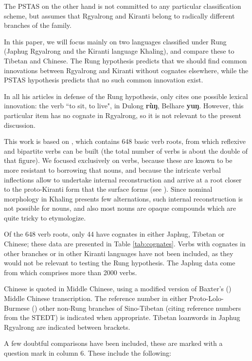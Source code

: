 \documentclass[oldfontcommands,oneside,a4paper,11pt]{article}
\newcommand{\ipa}[1]{{\phon\textbf{#1}}}
\begin{document}
The PSTAS on the other hand is not committed to any particular classification scheme, but assumes that Rgyalrong and Kiranti belong to radically different branches of the family.

In this paper, we will focus mainly on two languages classified under Rung (Japhug Rgyalrong and the Kiranti language Khaling), and compare these to Tibetan and Chinese. The Rung hypothesis predicts that we should find common innovations between Rgyalrong and Kiranti without cognates elsewhere, while the PSTAS hypothesis predicts that no such common innovation exist.

In all his articles in defense of the Rung hypothesis, \citet{lapolla13subgrouping} only cites one possible lexical innovation: the verb ``to sit, to live", in Dulong \ipa{rùŋ}, Belhare \ipa{yuŋ}. However, this particular item has no cognate in Rgyalrong, so it is not relevant to the present discussion.

This work is based on \citet{jacques15khaling}, which contains 648 basic verb roots, from which reflexive and bipartite verbs can be built (the total number of verbs is about the double of that figure). We focused exclusively on verbs, because these are known to be more resistant to borrowing that nouns, and because the intricate verbal inflections allow to undertake internal reconstruction and arrive at a root closer to the proto-Kiranti form that the surface forms (see \citealt{jacques12khaling}). Since nominal morphology in Khaling presents few alternations, such internal reconstruction is not possible for nouns, and also most nouns are opaque compounds which are quite tricky to etymologize.

Of the 648 verb roots, only 44 have cognates in either Japhug, Tibetan or Chinese; these data are presented in Table \ref{tab:cognates}. Verbs with cognates in other branches or in other Kiranti languages have not been included, as they would not be relevant to testing the Rung hypothesis. The Japhug data come from \citet{jacques16japhug} which comprises more than 2000 verbs.

Chinese is quoted in Middle Chinese, using a modified version of Baxter's (\citeyear{baxter92}) Middle Chinese transcription. 
The reference number in either Proto-Lolo-Burmese (\citealt{bradley79}) other non-Rung branches of Sino-Tibetan (citing reference numbers from the STEDT) is indicated when appropriate. Tibetan loanwords in Japhug Rgyalrong are indicated between brackets.

A few doubtful comparisons have been included, these are marked with a question mark in column 6. These include the following:
\end{document}
